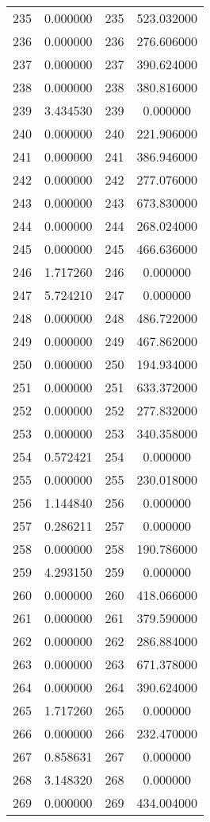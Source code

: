 \documentclass[12pt]{article}
\begin{document}
\begin{longtable}{@{}cccc@{}}
235 & 0.000000 & 235 & 523.032000 \\
236 & 0.000000 & 236 & 276.606000 \\
237 & 0.000000 & 237 & 390.624000 \\
238 & 0.000000 & 238 & 380.816000 \\
239 & 3.434530 & 239 & 0.000000 \\
240 & 0.000000 & 240 & 221.906000 \\
241 & 0.000000 & 241 & 386.946000 \\
242 & 0.000000 & 242 & 277.076000 \\
243 & 0.000000 & 243 & 673.830000 \\
244 & 0.000000 & 244 & 268.024000 \\
245 & 0.000000 & 245 & 466.636000 \\
246 & 1.717260 & 246 & 0.000000 \\
247 & 5.724210 & 247 & 0.000000 \\
248 & 0.000000 & 248 & 486.722000 \\
249 & 0.000000 & 249 & 467.862000 \\
250 & 0.000000 & 250 & 194.934000 \\
251 & 0.000000 & 251 & 633.372000 \\
252 & 0.000000 & 252 & 277.832000 \\
253 & 0.000000 & 253 & 340.358000 \\
254 & 0.572421 & 254 & 0.000000 \\
255 & 0.000000 & 255 & 230.018000 \\
256 & 1.144840 & 256 & 0.000000 \\
257 & 0.286211 & 257 & 0.000000 \\
258 & 0.000000 & 258 & 190.786000 \\
259 & 4.293150 & 259 & 0.000000 \\
260 & 0.000000 & 260 & 418.066000 \\
261 & 0.000000 & 261 & 379.590000 \\
262 & 0.000000 & 262 & 286.884000 \\
263 & 0.000000 & 263 & 671.378000 \\
264 & 0.000000 & 264 & 390.624000 \\
265 & 1.717260 & 265 & 0.000000 \\
266 & 0.000000 & 266 & 232.470000 \\
267 & 0.858631 & 267 & 0.000000 \\
268 & 3.148320 & 268 & 0.000000 \\
269 & 0.000000 & 269 & 434.004000 \\

\end{longtable}
\end{document}
